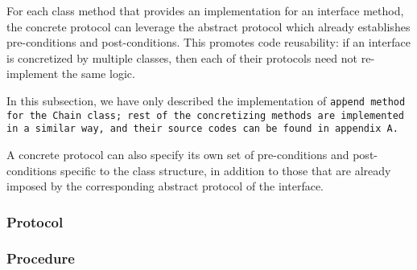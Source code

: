 \def\Subsubsection#1{\subsubsection{#1}}

For each class method that provides an implementation for an interface method,
the concrete protocol can leverage the abstract protocol
which already establishes pre-conditions and post-conditions.
This promotes code reusability: if an interface is concretized by multiple
classes, then each of their protocols need not re-implement the same logic.

In this subsection, we have only described the implementation of \tt{append}
method for the \tt{Chain} class; rest of the concretizing methods are implemented
in a similar way, and their source codes can be found in appendix A.

\note A concrete protocol can also specify its own set of pre-conditions and
post-conditions specific to the class structure, in addition to those that
are already imposed by the corresponding abstract protocol of the interface.

\Subsubsection{Protocol}

\Subsubsection{Procedure}
